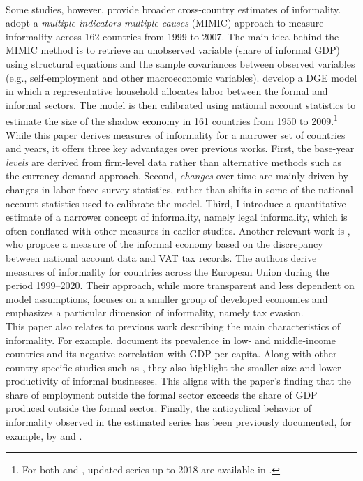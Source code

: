 \documentclass[letterpaper, 12pt]{article}
\begin{document}
\\Some studies, however, provide broader cross-country estimates of informality. \textcolor{blue}{\textcite{schneideretal2010}} adopt a \textit{multiple indicators multiple causes} (MIMIC) approach to measure informality across 162 countries from 1999 to 2007. The main idea behind the MIMIC method is to retrieve an unobserved variable (share of informal GDP) using structural equations and the sample covariances between observed variables (e.g., self-employment and other macroeconomic variables).  \textcolor{blue}{\textcite{elginoztunali2012}} develop a DGE model in which a representative household allocates labor between the formal and informal sectors.  The model is then calibrated using national account statistics to estimate the size of the shadow economy in 161 countries from 1950 to 2009.\footnote{For both \textcolor{blue}{\textcite{schneideretal2010}} and \textcolor{blue}{\textcite{elginoztunali2012}}, updated series up to 2018 are available in \textcolor{blue}{\textcite{elginetal2021}}.} While this paper derives measures of informality for a narrower set of countries and years, it offers three key advantages over previous works. First, the base-year \textit{levels} are derived from firm-level data rather than alternative methods such as the currency demand approach. Second, \textit{changes} over time are mainly driven by changes in labor force survey statistics, rather than shifts in some of the national account statistics used to calibrate the model. Third, I introduce a quantitative estimate of a narrower concept of informality, namely legal informality, which is often conflated with other measures in earlier studies. Another relevant work is \textcolor{blue}{\textcite{pappadarogoff2025}}, who propose a measure of the informal economy based on the discrepancy between national account data and VAT tax records. The authors derive measures of informality for countries across the European Union during the period 1999–2020. Their approach, while more transparent and less dependent on model assumptions, focuses on a smaller group of developed economies and emphasizes a particular dimension of informality, namely tax evasion. 
\\This paper also relates to previous work describing the main characteristics of informality. For example, \textcolor{blue}{\textcite{laportashleifer2014}} document its prevalence in low- and middle-income countries and its negative correlation with GDP per capita. Along with other country-specific studies such as \textcolor{blue}{\textcite{ulyssea2018}}, they also highlight
the smaller size and lower productivity of informal businesses. This aligns with the paper's finding that the share of employment outside the formal sector exceeds the share of GDP produced outside the formal sector. Finally, the anticyclical behavior of informality observed in the estimated series has been previously documented, for example, by \textcolor{blue}{\textcite{leyvaurrutia2020}} and \textcolor{blue}{\textcite{pappadarogoff2025}}. 
\end{document}
